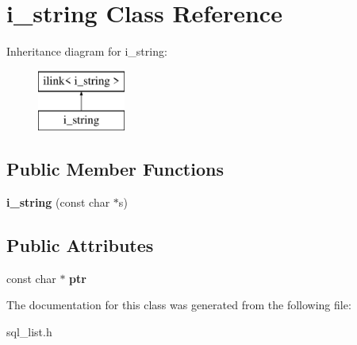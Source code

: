 \hypertarget{classi__string}{}\section{i\+\_\+string Class Reference}
\label{classi__string}
Inheritance diagram for i\+\_\+string\+:\begin{figure}[H]
\begin{center}
\leavevmode
\includegraphics[height=2.000000cm]{classi__string}
\end{center}
\end{figure}
\subsection*{Public Member Functions}
\begin{DoxyCompactItemize}
\item 
\mbox{\label{classi__string_a5f92298c4f0e25ca706d1294b94b2ee4}} 
{\bfseries i\+\_\+string} (const char $\ast$s)
\end{DoxyCompactItemize}
\subsection*{Public Attributes}
\begin{DoxyCompactItemize}
\item 
\mbox{\label{classi__string_aec797ac4cdd0947e203e13afbd00e1d9}} 
const char $\ast$ {\bfseries ptr}
\end{DoxyCompactItemize}


The documentation for this class was generated from the following file\+:\begin{DoxyCompactItemize}
\item 
sql\+\_\+list.\+h\end{DoxyCompactItemize}
